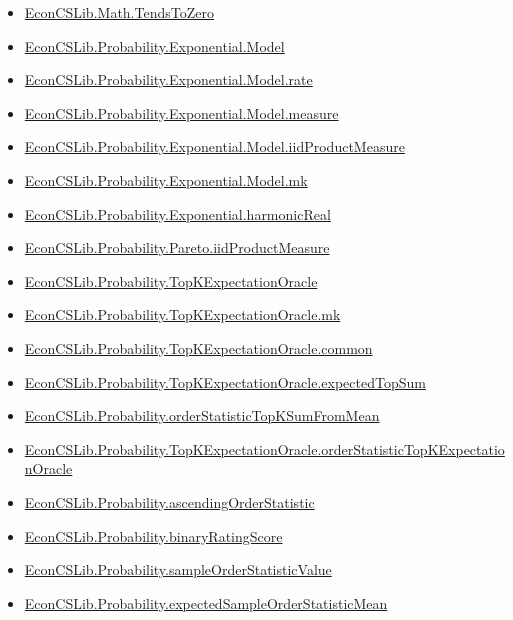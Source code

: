 \documentclass[10pt]{article}
\begin{document}
\begin{itemize}[leftmargin=1.2em]
\begin{itemize}[leftmargin=1.2em]
\item \hyperlink{library-prerequisite-0d847b93822bc6c4}{EconCSLib.Math.TendsToZero}
\item \hyperlink{library-prerequisite-00608e839979428a}{EconCSLib.Probability.Exponential.Model}
\item \hyperlink{library-prerequisite-ebd02d956f133ba1}{EconCSLib.Probability.Exponential.Model.rate}
\item \hyperlink{library-prerequisite-46315b27c25dd5ba}{EconCSLib.Probability.Exponential.Model.measure}
\item \hyperlink{library-prerequisite-374422e12fa3aeb6}{EconCSLib.Probability.Exponential.Model.iidProductMeasure}
\item \hyperlink{library-prerequisite-f979086662c1cf00}{EconCSLib.Probability.Exponential.Model.mk}
\item \hyperlink{library-prerequisite-02420e071ed4ec26}{EconCSLib.Probability.Exponential.harmonicReal}
\item \hyperlink{library-prerequisite-83df72d297d25686}{EconCSLib.Probability.Pareto.iidProductMeasure}
\item \hyperlink{library-prerequisite-18052cb8ae517639}{EconCSLib.Probability.TopKExpectationOracle}
\item \hyperlink{library-prerequisite-6edb20c3dcdd9767}{EconCSLib.Probability.TopKExpectationOracle.mk}
\item \hyperlink{library-prerequisite-b4ecb635d6064acd}{EconCSLib.Probability.TopKExpectationOracle.common}
\item \hyperlink{library-prerequisite-f3d0f68534aa7689}{EconCSLib.Probability.TopKExpectationOracle.expectedTopSum}
\item \hyperlink{library-prerequisite-e63098616a4b886a}{EconCSLib.Probability.orderStatisticTopKSumFromMean}
\item \hyperlink{library-prerequisite-11c2928776f87e9b}{EconCSLib.Probability.TopKExpectationOracle.orderStatisticTopKExpectationOracle}
\item \hyperlink{library-prerequisite-5424336cdb453911}{EconCSLib.Probability.ascendingOrderStatistic}
\item \hyperlink{library-prerequisite-4cea2ad3a0ac0028}{EconCSLib.Probability.binaryRatingScore}
\item \hyperlink{library-prerequisite-d15dae326946f52b}{EconCSLib.Probability.sampleOrderStatisticValue}
\item \hyperlink{library-prerequisite-0f0bc5629332b317}{EconCSLib.Probability.expectedSampleOrderStatisticMean}

\end{itemize}
\end{itemize}
\end{document}
